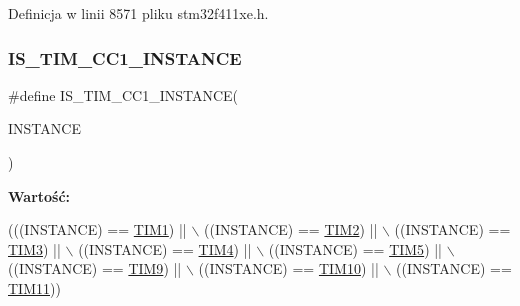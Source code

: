 Definicja w linii 8571 pliku stm32f411xe.\+h.

\mbox{\label{group___exported__macros_ga0c02efc77b1bfb640d7f6593f58ad464}} 
\subsubsection{\texorpdfstring{I\+S\+\_\+\+T\+I\+M\+\_\+\+C\+C1\+\_\+\+I\+N\+S\+T\+A\+N\+CE}{IS\_TIM\_CC1\_INSTANCE}}
{\footnotesize\ttfamily \#define I\+S\+\_\+\+T\+I\+M\+\_\+\+C\+C1\+\_\+\+I\+N\+S\+T\+A\+N\+CE(\begin{DoxyParamCaption}\item[{}]{I\+N\+S\+T\+A\+N\+CE }\end{DoxyParamCaption})}

{\bfseries Wartość\+:}
\begin{DoxyCode}
(((INSTANCE) == \hyperlink{group___peripheral__declaration_ga2e87451fea8dc9380056d3cfc5ed81fb}{TIM1})  || \(\backslash\)
                                         ((INSTANCE) == \hyperlink{group___peripheral__declaration_ga3cfac9f2e43673f790f8668d48b4b92b}{TIM2})  || \(\backslash\)
                                         ((INSTANCE) == \hyperlink{group___peripheral__declaration_ga61ee4c391385607d7af432b63905fcc9}{TIM3})  || \(\backslash\)
                                         ((INSTANCE) == \hyperlink{group___peripheral__declaration_ga91a09bad8bdc7a1cb3d85cf49c94c8ec}{TIM4})  || \(\backslash\)
                                         ((INSTANCE) == \hyperlink{group___peripheral__declaration_ga5125ff6a23a2ed66e2e19bd196128c14}{TIM5})  || \(\backslash\)
                                         ((INSTANCE) == \hyperlink{group___peripheral__declaration_gaf52b4b4c36110a0addfa98059f54a50e}{TIM9})  || \(\backslash\)
                                         ((INSTANCE) == \hyperlink{group___peripheral__declaration_ga46b2ad3f5f506f0f8df0d2ec3e767267}{TIM10}) || \(\backslash\)
                                         ((INSTANCE) == \hyperlink{group___peripheral__declaration_gacfd11ef966c7165f57e2cebe0abc71ad}{TIM11}))
\end{DoxyCode}


